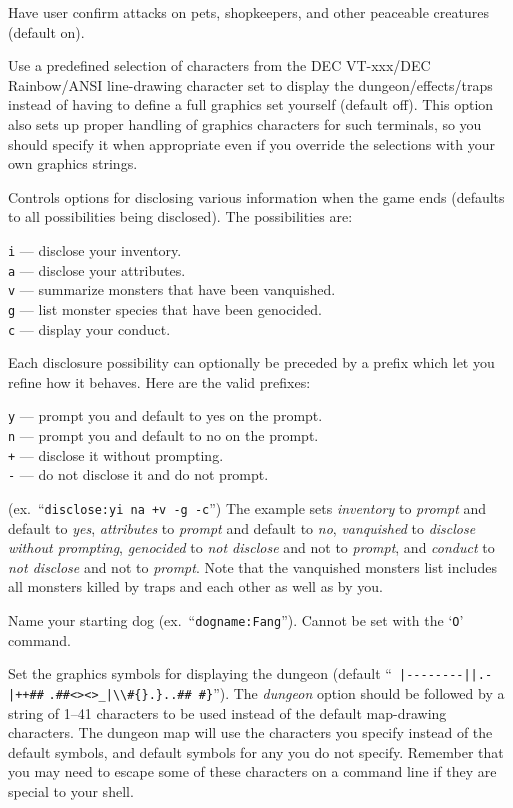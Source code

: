 \item[\ib{confirm}]
Have user confirm attacks on pets, shopkeepers, and other
peaceable creatures (default on).
\item[\ib{DECgraphics}]
Use a predefined selection of characters from the DEC VT-xxx/DEC
Rainbow/ANSI line-drawing character set to display the dungeon/effects/traps
instead of having to define a full graphics set yourself (default off).
This option also sets up proper handling of graphics
characters for such terminals, so you should specify it when appropriate
even if you override the selections with your own graphics strings.
\item[\ib{disclose}]
Controls options for disclosing various information when the game ends (defaults
to all possibilities being disclosed).
The possibilities are:

{\tt i} --- disclose your inventory.\\
{\tt a} --- disclose your attributes.\\
{\tt v} --- summarize monsters that have been vanquished.\\
{\tt g} --- list monster species that have been genocided.\\
{\tt c} --- display your conduct.

Each disclosure possibility can optionally be preceded by a prefix which
let you refine how it behaves. Here are the valid prefixes:

{\tt y} --- prompt you and default to yes on the prompt.\\
{\tt n} --- prompt you and default to no on the prompt.\\
{\tt +} --- disclose it without prompting.\\
{\tt -} --- do not disclose it and do not prompt.

(ex.\ ``{\tt disclose:yi na +v -g -c}'')
The example sets {\it inventory\/} to {\it prompt\/} and default to {\it yes\/}, 
{\it attributes\/} to {\it prompt\/} and default to {\it no\/}, 
{\it vanquished\/} to {\it disclose without prompting\/}, 
{\it genocided\/} to {\it not disclose\/} and not to {\it prompt\/}, and 
{\it conduct\/} to {\it not disclose\/} and not to {\it prompt\/}.
Note that the vanquished monsters list includes all monsters killed by
traps and each other as well as by you. 
\item[\ib{dogname}]
Name your starting dog (ex.\ ``{\tt dogname:Fang}'').
Cannot be set with the `{\tt O}' command.
\item[\ib{dungeon}]
Set the graphics symbols for displaying the dungeon (default
``\verb& |--------||.-|++##& \verb&.##<><>_|\\#{}.}..## #}&'').
The {\it dungeon\/} option should be
followed by a string of 1--41
characters to be used instead of the default map-drawing characters.
The dungeon map will use the characters you specify instead of the
default symbols, and default symbols for any you do not specify.
Remember that you may need to escape some of these characters
on a command line if they are special to your shell.

